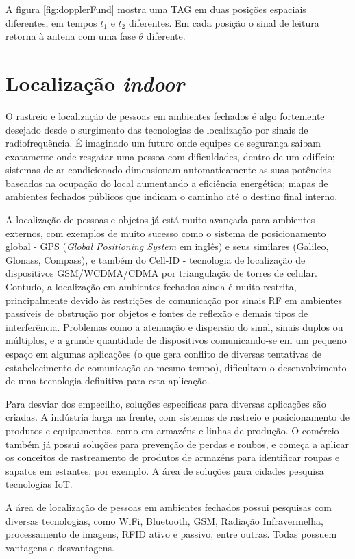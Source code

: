 A figura \ref{fig:dopplerFund} mostra uma TAG em duas posições espaciais diferentes, em tempos $t_1$ e $t_2$ diferentes. Em cada posição o sinal de leitura retorna à antena com uma fase $\theta$ diferente.
    
\section{Localização \textit{indoor}}

O rastreio e localização de pessoas em ambientes fechados é algo fortemente desejado desde o surgimento das tecnologias de localização por sinais de radiofrequência. É imaginado um futuro onde equipes de segurança saibam exatamente onde resgatar uma pessoa com dificuldades, dentro de um edifício; sistemas de ar-condicionado dimensionam automaticamente as suas potências baseados na ocupação do local aumentando a eficiência energética; mapas de ambientes fechados públicos que indicam o caminho até o destino final interno.

A localização de pessoas e objetos já está muito avançada para ambientes externos, com exemplos de muito sucesso como o sistema de posicionamento global - GPS (\textit{Global Positioning System} em inglês) e seus similares (Galileo, Glonass, Compass), e também do Cell-ID - tecnologia de localização de dispositivos GSM/WCDMA/CDMA por triangulação de torres de celular. Contudo, a localização em ambientes fechados ainda é muito restrita, principalmente devido às restrições de comunicação por sinais RF em ambientes passíveis de obstrução por objetos e fontes de reflexão e demais tipos de interferência. Problemas como a atenuação e dispersão do sinal, sinais duplos ou múltiplos, e a grande quantidade de dispositivos comunicando-se em um pequeno espaço em algumas aplicações (o que gera conflito de diversas tentativas de estabelecimento de comunicação ao mesmo tempo), dificultam o desenvolvimento de uma tecnologia definitiva para esta aplicação.

Para desviar dos empecilho, soluções específicas para diversas aplicações são criadas. A indústria larga na frente, com sistemas de rastreio e posicionamento de produtos e equipamentos, como em armazéns e linhas de produção. O comércio também já possui soluções para prevenção de perdas e roubos, e começa a aplicar os conceitos de rastreamento de produtos de armazéns para identificar roupas e sapatos em estantes, por exemplo. A área de soluções para cidades pesquisa tecnologias IoT.

A área de localização de pessoas em ambientes fechados possui pesquisas com diversas tecnologias, como WiFi, Bluetooth, GSM, Radiação Infravermelha, processamento de imagens, RFID ativo e passivo, entre outras. Todas possuem vantagens e desvantagens.

